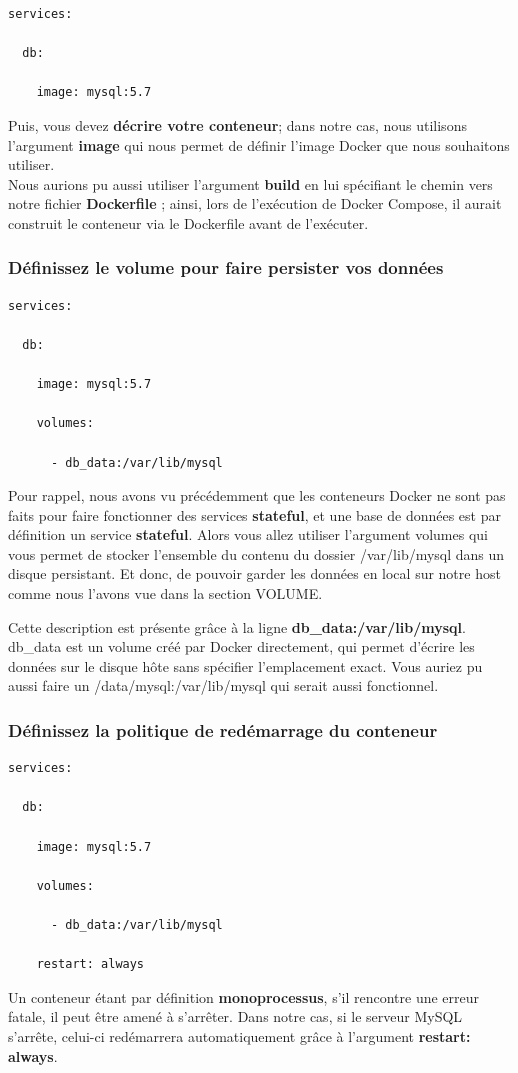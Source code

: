 \documentclass[12pt,a4paper]{article}
\begin{document}
\begin{verbatim}
services:

  db:

    image: mysql:5.7
\end{verbatim}

Puis, vous devez \textbf{décrire votre conteneur}; dans notre cas, nous utilisons l’argument \textbf{image} qui nous permet de définir l'image Docker que nous souhaitons utiliser.\\

Nous aurions pu aussi utiliser l’argument \textbf{build} en lui spécifiant le chemin vers notre fichier \textbf{Dockerfile} ; ainsi, lors de l’exécution de Docker Compose, il aurait construit le conteneur via le Dockerfile avant de l’exécuter.

\subsubsection{Définissez le volume pour faire persister vos données}
\begin{verbatim}
services:

  db:

    image: mysql:5.7

    volumes:

      - db_data:/var/lib/mysql
\end{verbatim}

Pour rappel, nous avons vu précédemment que les conteneurs Docker ne sont pas faits pour faire fonctionner des services \textbf{stateful}, et une base de données est par définition un service \textbf{stateful}. Alors vous allez utiliser l'argument volumes qui vous permet de stocker l'ensemble du contenu du dossier /var/lib/mysql dans un disque persistant. Et donc, de pouvoir garder les données en local sur notre host comme nous l'avons vue dans
la section VOLUME.

Cette description est présente grâce à la ligne \textbf{db\_data:/var/lib/mysql}. db\_data est un volume créé par Docker directement, qui permet d'écrire les données sur le disque hôte sans spécifier l'emplacement exact. Vous auriez pu aussi faire un /data/mysql:/var/lib/mysql qui serait aussi fonctionnel.
\subsubsection{Définissez la politique de redémarrage du conteneur}
\begin{verbatim}
services:

  db:

    image: mysql:5.7

    volumes:

      - db_data:/var/lib/mysql

    restart: always
\end{verbatim}
Un conteneur étant par définition \textbf{monoprocessus}, s'il rencontre une erreur fatale, il peut être amené à s'arrêter. Dans notre cas, si le serveur MySQL s'arrête, celui-ci redémarrera automatiquement grâce à l'argument \textbf{restart: always}.
\end{document}
